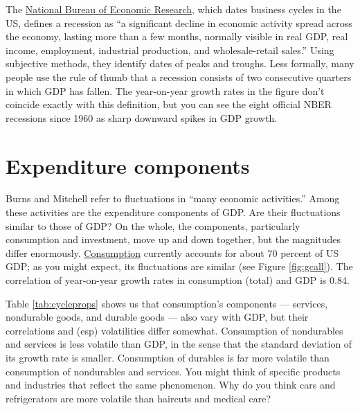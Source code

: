 The \href{http://www.nber.org/cycles/main.html}{National Bureau of Economic Research},
which dates business cycles in the US,
defines a recession as ``a significant decline
in economic activity spread across the economy,
lasting more than a few months, normally visible in real GDP,
real income, employment, industrial production,
and wholesale-retail sales.''
Using subjective methods, they identify dates of peaks and troughs.
Less formally, many people use the rule of thumb
that a recession consists of two consecutive quarters
in which GDP has fallen.
The year-on-year growth rates in the figure don't coincide exactly
with this definition, but you can see the eight official NBER
recessions since 1960 as sharp downward spikes in GDP growth.


\section{Expenditure components}

Burns and Mitchell refer to fluctuations in
``many economic activities.''
Among these activities are the expenditure
components of GDP.
Are their fluctuations similar to those of GDP?
On the whole, the components, particularly consumption and investment,
move up and down together, but the magnitudes differ enormously.
\href{http://research.stlouisfed.org/fred2/series/PCECC96?cid=110}{Consumption}
currently accounts for about 70 percent of US GDP;
as you might expect, its fluctuations are similar (see Figure \ref{fig:gcall}).
The correlation of year-on-year growth rates in consumption (total)
and GDP is 0.84.

Table \ref{tab:cycleprops} shows us that consumption's components ---
services, nondurable goods, and durable goods --- also vary with GDP,
but their correlations and (esp) volatilities differ somewhat.
Consumption of nondurables and services
is less volatile than GDP, in the sense that
the standard deviation of its growth rate is smaller.
Consumption of durables is far more
volatile %
than consumption of nondurables and services.
You might think of specific products and industries that reflect
the same phenomenon.
Why do you think cars and refrigerators
are more volatile than haircuts and medical care?

